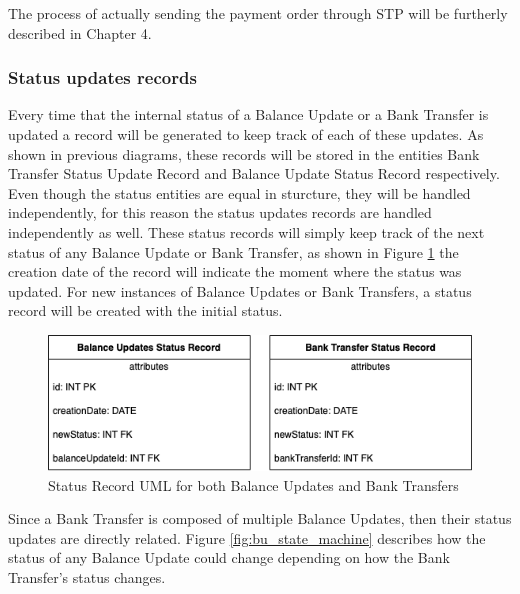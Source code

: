 The process of actually sending the payment order through STP will be furtherly described in Chapter 4.\\

\subsubsection{Status updates records}

Every time that the internal status of a Balance Update or a Bank Transfer is updated a record will be generated to keep track of each of these updates. As shown in previous diagrams, these records will be stored in the entities Bank Transfer Status Update Record and Balance Update Status Record respectively. Even though the status entities are equal in sturcture, they will be handled independently, for this reason the status updates records are handled independently as well.
These status records will simply keep track of the next status of any Balance Update or Bank Transfer, as shown in Figure \ref{fig:status_record_uml} the creation date of the record will indicate the moment where the status was updated. For new instances of Balance Updates or Bank Transfers, a status record will be created with the initial status. 

\begin{figure} [H]
    \centering
    \includegraphics[scale = 0.6]{assets/uml/StatusRecordUML.png}
    \caption{Status Record UML for both Balance Updates and Bank Transfers}\label{fig:status_record_uml}
\end{figure}

Since a Bank Transfer is composed of multiple Balance Updates, then their status updates are directly related. Figure \ref{fig:bu_state_machine} describes how the status of any Balance Update could change depending on how the Bank Transfer's status changes. 

